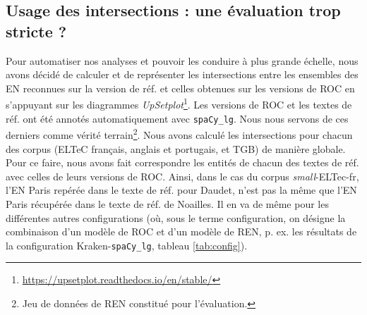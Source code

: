 \subsection{Usage des intersections : une évaluation trop stricte ?}
\label{subsec:inter_OCR-IMPACT-NER}
Pour automatiser nos analyses et pouvoir les conduire à plus grande échelle, nous avons décidé de calculer et de représenter les intersections entre les ensembles des EN reconnues sur la version de réf. et celles obtenues sur les versions de ROC en s'appuyant sur les diagrammes \textit{UpSetplot}\footnote{\url{https://upsetplot.readthedocs.io/en/stable/}}. Les versions de ROC et les textes de réf. ont été annotés automatiquement avec \texttt{spaCy\_lg}. Nous nous servons de ces derniers comme vérité terrain\footnote{Jeu de données de REN constitué pour l'évaluation.}. Nous avons calculé les intersections pour chacun des corpus (ELTeC français, anglais et portugais, et TGB) de manière globale. 
Pour ce faire, nous avons fait correspondre les entités de chacun des textes de réf. avec celles de leurs versions de ROC. Ainsi, dans le cas du corpus \textit{small}-ELTec-fr, l'EN \og{}Paris\fg{} repérée dans le texte de réf. pour Daudet, n'est pas la même que l'EN \og{}Paris\fg{} récupérée dans le texte de réf. de Noailles. Il en va de même pour les différentes autres configurations (où, sous le terme \og{}configuration\fg{}, on désigne la combinaison d'un modèle de ROC et d'un modèle de REN, p. ex. les résultats de la configuration Kraken-\texttt{spaCy\_lg}, tableau \ref{tab:config}).

